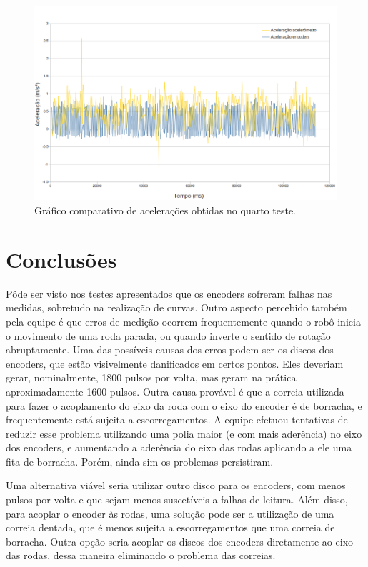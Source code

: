 \begin{figure}[H]
	\centering
	\includegraphics[width=1\textwidth]{./figuras/testes/teste4/grafico_acel.png}
	\caption{Gráfico comparativo de acelerações obtidas no quarto teste.}
	\label{fig:teste4_acel_grafico}
\end{figure}

\chapter{Conclusões}

Pôde ser visto nos testes apresentados que os encoders sofreram falhas nas medidas, sobretudo na realização de curvas. Outro aspecto percebido também pela equipe é que erros de medição ocorrem frequentemente quando o robô inicia o movimento de uma roda parada, ou quando inverte o sentido de rotação abruptamente. Uma das possíveis causas dos erros podem ser os discos dos encoders, que estão visivelmente danificados em certos pontos. Eles deveriam gerar, nominalmente, 1800 pulsos por volta, mas geram na prática aproximadamente 1600 pulsos.
Outra causa provável é que a correia utilizada para fazer o acoplamento do eixo da roda com o eixo do encoder é de borracha, e frequentemente está sujeita a escorregamentos. A equipe efetuou tentativas de reduzir esse problema utilizando uma polia maior (e com mais aderência) no eixo dos encoders, e aumentando a aderência do eixo das rodas aplicando a ele uma fita de borracha. Porém, ainda sim os problemas persistiram. 

Uma alternativa viável seria utilizar outro disco para os encoders, com menos pulsos por volta e que sejam menos suscetíveis a falhas de leitura. Além disso, para acoplar o encoder às rodas, uma solução pode ser a utilização de uma correia dentada, que é menos sujeita a escorregamentos que uma correia de borracha. Outra opção seria acoplar os discos dos encoders diretamente ao eixo das rodas, dessa maneira eliminando o problema das correias.

